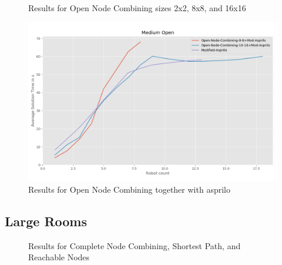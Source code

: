 \documentclass[runningheads]{llncs}
\begin{document}
\begin{figure}[H]
\begin{minipage}{.4\linewidth}
\caption{Results for Open Node Combining sizes 2x2, 8x8, and 16x16}
\end{minipage}
\end{figure} 
\begin{figure}[H]
\includegraphics[scale=0.4]{Images/Results-Medium-Open-3}
\caption{Results for Open Node Combining together with asprilo}
\end{figure}

\subsection{Large Rooms}
\begin{figure}[H]
\caption{Results for Complete Node Combining, Shortest Path, and Reachable Nodes}
\end{figure}
\end{document}
